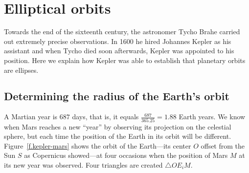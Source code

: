

\section{Elliptical orbits}\label{s.kepler}

Towards the end of the sixteenth century, the astronomer Tycho Brahe carried out extremely precise observations. In 1600 he hired Johannes Kepler as his assistant and when Tycho died soon afterwards, Kepler was appointed to his position. Here we explain how Kepler was able to establish that planetary orbits are ellipses.

\subsection{Determining the radius of the Earth's orbit}

A Martian year is $687$ days, that is, it equals $\frac{687}{365.25} = 1.88$ Earth years. We know when Mars reaches a new ``year'' by observing its projection on the celestial sphere, but each time the position of the Earth in its orbit will be different. Figure~\ref{f.kepler-mars} shows the orbit of the Earth---its center $O$ offset from the Sun $S$ as Copernicus showed---at four occasions when the position of Mars $M$ at its new year was observed. Four triangles are created $\triangle OE_iM$.


